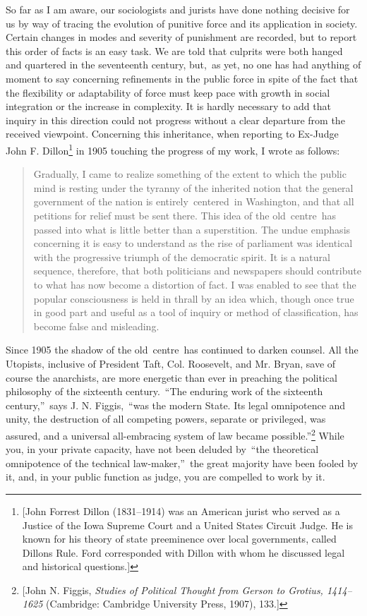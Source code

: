 \documentclass[twoside,symmetric,nobib,justified]{tufte-book}
\begin{document}
So far as I am aware, our sociologists and jurists have done nothing
decisive for us by way of tracing the evolution of punitive force and
its application in society. Certain changes in modes and severity of
punishment are recorded, but to report this order of facts is an easy
task. We are told that culprits were both hanged and quartered in the
seventeenth century, but,~as yet, no one has had anything of moment to
say concerning refinements in the public force in spite of the fact that
the flexibility or adaptability of force must keep pace with growth in
social integration or the increase in complexity. It is hardly necessary
to add that inquiry in this direction could not progress without a clear
departure from the received viewpoint. Concerning this inheritance, when
reporting to Ex-Judge John F. Dillon\footnote{{[}John Forrest
  Dillon (1831--1914) was an American jurist who served as a Justice of
  the Iowa Supreme Court and a United States Circuit Judge. He is known
  for his theory of state preeminence over
  local governments, called Dillon\textquotesingle s Rule. Ford
  corresponded with Dillon with whom he discussed legal and historical
  questions.{]}} in 1905 touching the progress of my work, I wrote as
follows:~

\begin{quote}
Gradually, I came to realize something of the extent to which the public
mind is resting under the tyranny of the inherited notion that the
general government of the nation is entirely~centered~in Washington, and
that all petitions for relief must be sent there. This idea of the
old~centre~has passed into what is little better than a superstition.
The undue emphasis concerning it is easy to understand as the rise of
parliament was identical with the progressive triumph of the democratic
spirit. It is a natural sequence, therefore, that both politicians and
newspapers should contribute to what has now become a distortion of
fact. I was enabled to see that the popular consciousness is held in
thrall by an idea which, though once true in good part and useful as a
tool of inquiry or method of classification, has become false and
misleading.~
\end{quote}

\noindent Since 1905 the shadow of the old~centre~has continued to darken counsel.
All the Utopists, inclusive of President Taft, Col. Roosevelt, and Mr.
Bryan, save of course the anarchists, are more energetic than ever in
preaching the political philosophy of the sixteenth century.~``The
enduring work of the sixteenth century,''~says J. N. Figgis,~``was the
modern State. Its legal omnipotence and unity, the destruction of all
competing powers, separate or privileged, was assured, and a universal
all-embracing system of law became possible.''\footnote{{[}John N.
  Figgis, \emph{Studies of Political Thought from Gerson to Grotius,
  1414--1625} (Cambridge: Cambridge University Press, 1907), 133.{]}}
While you, in your private capacity, have not been deluded by~``the
theoretical omnipotence of the technical law-maker,''~the great majority
have been fooled by it, and, in your public function as judge, you are
compelled to work by it.~
\end{document}
